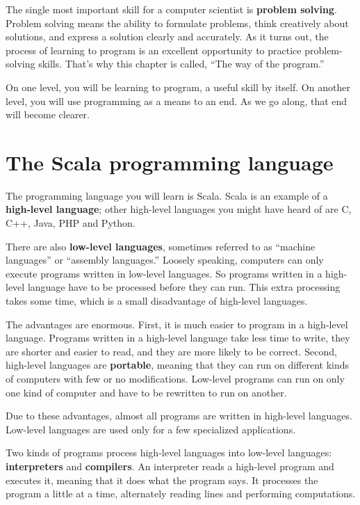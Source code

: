\documentclass[10pt]{book}
\begin{document}
The single most important skill for a computer scientist is {\bf
problem solving}.  Problem solving means the ability to formulate
problems, think creatively about solutions, and express a solution clearly
and accurately.  As it turns out, the process of learning to program is an
excellent opportunity to practice problem-solving skills.  That's why
this chapter is called, ``The way of the program.''

On one level, you will be learning to program, a useful
skill by itself.  On another level, you will use programming as a means to
an end.  As we go along, that end will become clearer.

\section{The Scala programming language}

The programming language you will learn is Scala. Scala is
an example of a {\bf high-level language}; other high-level languages
you might have heard of are C, C++, Java, PHP and Python.

There are also {\bf low-level languages}, sometimes referred to as ``machine
languages'' or ``assembly languages.''  Loosely speaking, computers
can only execute programs written in low-level languages.  So
programs written in a high-level language have to be processed before
they can run.  This extra processing takes some time, which is a small
disadvantage of high-level languages.


The advantages are enormous.  First, it is much easier to program
in a high-level language.  Programs written in a high-level language
take less time to write, they are shorter and easier to read, and they
are more likely to be correct.  Second, high-level languages are {\bf
portable}, meaning that they can run on different kinds of computers
with few or no modifications.  Low-level programs can run on only one
kind of computer and have to be rewritten to run on another.

Due to these advantages, almost all programs are written in high-level
languages.  Low-level languages are used only for a few specialized
applications.


Two kinds of programs process high-level languages
into low-level languages: {\bf interpreters} and {\bf compilers}.
An interpreter reads a high-level program and executes it, meaning that it
does what the program says.  It processes the program a little at a time,
alternately reading lines and performing computations.
\end{document}
